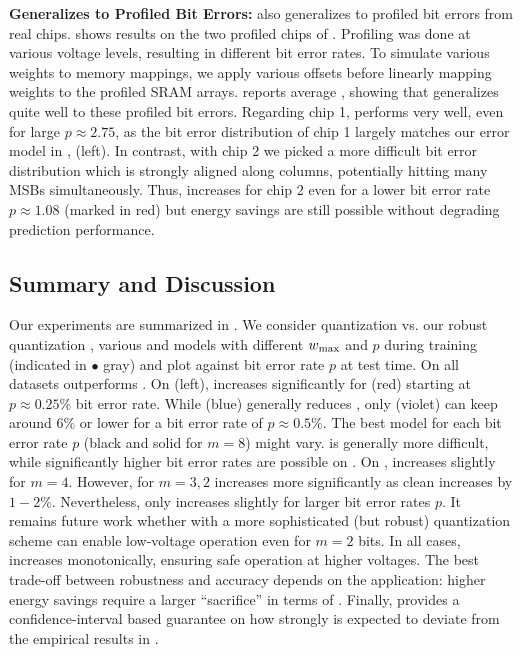 \textbf{\Random Generalizes to Profiled Bit Errors:}
% 
\Random also generalizes to profiled bit errors from real chips.  shows results on the two profiled chips of . Profiling was done at various voltage levels, resulting in different bit error rates. To simulate various weights to memory mappings, we apply various offsets before linearly mapping weights to the profiled SRAM arrays.  reports average \RTE, showing that \Random generalizes quite well to these profiled bit errors. Regarding chip 1, \Random performs very well, even for large $p\approx 2.75$, as the bit error distribution of chip 1 largely matches our error model in , \cf {} (left). In contrast, with chip 2 we picked a more difficult bit error distribution which is strongly aligned along columns, potentially hitting many MSBs simultaneously. Thus, \RTE increases for chip 2 even for a lower bit error rate $p \approx 1.08$ (marked in {\color{colorbrewer1}red})
but energy savings are still possible without degrading prediction performance. 

\subsection{Summary and Discussion}
\label{subsec:experiments-discussion}
 
Our experiments are summarized in . We consider \Normal quantization vs. our robust quantization \Quant, various \Clipping and \Random models with different $\wmax$ and $p$ during training (indicated in {\color{gray}$\bullet$ gray}) and plot \RTE against bit error rate $p$ at test time. On all datasets \Quant outperforms \Normal. On \CifarT (left), \RTE increases significantly for \Quant ({\color{colorbrewer1}red}) starting at $p \approx 0.25\%$ bit error rate. While \Clipping ({\color{colorbrewer2}blue}) generally reduces \RTE, only \Random ({\color{colorbrewer4}violet}) can keep \RTE around $6\%$ or lower for a bit error rate of $p \approx 0.5\%$. The best model for each bit error rate $p$ (black and solid for $m = 8$) might vary. \CifarH is generally more difficult, while significantly higher bit error rates are possible on \MNIST. On \CifarT, \RTE increases slightly for $m = 4$. However, for $m = 3,2$ \RTE increases more significantly as clean \TE increases by $1-2\%$. %
Nevertheless, \RTE only increases slightly for larger bit error rates $p$. It remains future work whether \Random with a more sophisticated (but robust) quantization scheme can enable low-voltage operation even for $m = 2$ bits. In all cases, \RTE increases monotonically, ensuring safe operation at higher voltages. The best trade-off between robustness and accuracy depends on the application: higher energy savings require a larger ``sacrifice'' in terms of \RTE.
Finally,  provides a
confidence-interval based guarantee on how strongly \RTE is expected to deviate from the empirical results in .

